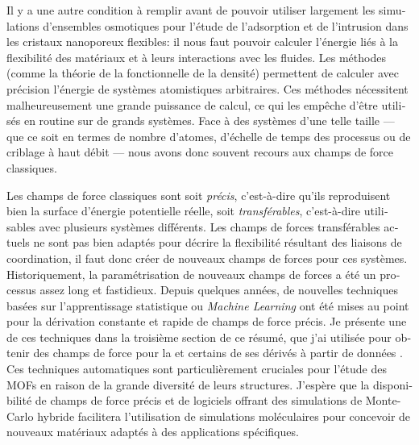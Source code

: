 \documentclass[thesis]{subfiles}
\begin{document}
\begin{otherlanguage}{french}
Il y a une autre condition à remplir avant de pouvoir utiliser largement les
simulations d'ensembles osmotiques pour l'étude de l'adsorption et de
l'intrusion dans les cristaux nanoporeux flexibles: il nous faut pouvoir
calculer l'énergie liés à la flexibilité des matériaux et à leurs interactions
avec les fluides. Les méthodes \abinitio (comme la théorie de la fonctionnelle
de la densité) permettent de calculer avec précision l'énergie de systèmes
atomistiques arbitraires. Ces méthodes nécessitent malheureusement une grande
puissance de calcul, ce qui les empêche d'être utilisés en routine sur de grands
systèmes. Face à des systèmes d'une telle taille --- que ce soit en termes de
nombre d'atomes, d'échelle de temps des processus ou de criblage à haut débit
--- nous avons donc souvent recours aux champs de force classiques.

Les champs de force classiques sont soit \emph{précis}, c'est-à-dire qu'ils
reproduisent bien la surface d'énergie potentielle réelle, soit
\emph{transférables}, c'est-à-dire utilisables avec plusieurs systèmes
différents. Les champs de forces transférables actuels ne sont pas bien adaptés
pour décrire la flexibilité résultant des liaisons de coordination, il faut donc
créer de nouveaux champs de forces pour ces systèmes. Historiquement, la
paramétrisation de nouveaux champs de forces a été un processus assez long et
fastidieux. Depuis quelques années, de nouvelles techniques basées sur
l'apprentissage statistique ou \emph{Machine Learning} ont été mises au point
pour la dérivation constante et rapide de champs de force précis. Je présente
une de ces techniques dans la troisième section de ce résumé, que j'ai utilisée
pour obtenir des champs de force pour la  et certains de ses dérivés à
partir de données \abinitio. Ces techniques automatiques sont particulièrement
cruciales pour l'étude des MOFs en raison de la grande diversité de leurs
structures. J'espère que la disponibilité de champs de force précis et de
logiciels offrant des simulations de Monte-Carlo hybride facilitera
l'utilisation de simulations moléculaires pour concevoir de nouveaux matériaux
adaptés à des applications spécifiques.

\begin{center}
\end{center}


\end{otherlanguage}
\end{document}
